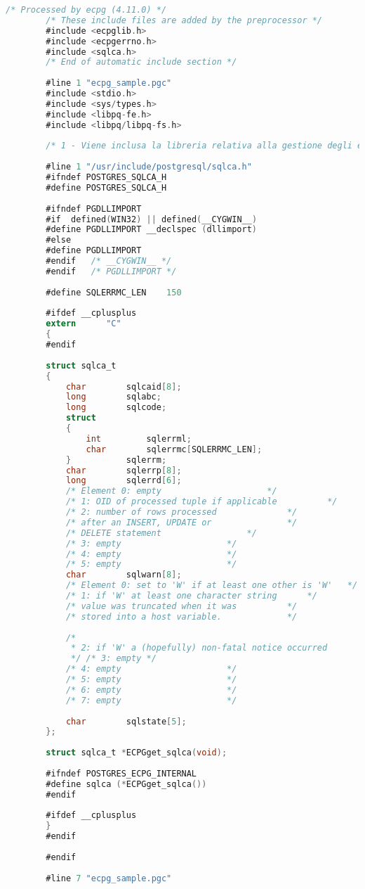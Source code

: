 \documentclass[12pt,a4paper,onecolumn]{article}
\begin{document}
	\begin{lstlisting}[language=C, caption=testECPG.c]
		/* Processed by ecpg (4.11.0) */
		/* These include files are added by the preprocessor */
		#include <ecpglib.h>
		#include <ecpgerrno.h>
		#include <sqlca.h>
		/* End of automatic include section */
		
		#line 1 "ecpg_sample.pgc"
		#include <stdio.h>
		#include <sys/types.h>
		#include <libpq-fe.h>
		#include <libpq/libpq-fs.h>
		
		/* 1 - Viene inclusa la libreria relativa alla gestione degli errori tramite la variabile globale sqlca (SQL communication area) */
		
		#line 1 "/usr/include/postgresql/sqlca.h"
		#ifndef POSTGRES_SQLCA_H
		#define POSTGRES_SQLCA_H
		
		#ifndef PGDLLIMPORT
		#if  defined(WIN32) || defined(__CYGWIN__)
		#define PGDLLIMPORT __declspec (dllimport)
		#else
		#define PGDLLIMPORT
		#endif   /* __CYGWIN__ */
		#endif   /* PGDLLIMPORT */
		
		#define SQLERRMC_LEN	150
		
		#ifdef __cplusplus
		extern		"C"
		{
		#endif
		
		struct sqlca_t
		{
			char		sqlcaid[8];
			long		sqlabc;
			long		sqlcode;
			struct
			{
				int			sqlerrml;
				char		sqlerrmc[SQLERRMC_LEN];
			}			sqlerrm;
			char		sqlerrp[8];
			long		sqlerrd[6];
			/* Element 0: empty						*/
			/* 1: OID of processed tuple if applicable			*/
			/* 2: number of rows processed				*/
			/* after an INSERT, UPDATE or				*/
			/* DELETE statement					*/
			/* 3: empty						*/
			/* 4: empty						*/
			/* 5: empty						*/
			char		sqlwarn[8];
			/* Element 0: set to 'W' if at least one other is 'W'	*/
			/* 1: if 'W' at least one character string		*/
			/* value was truncated when it was			*/
			/* stored into a host variable.             */
		
			/*
			 * 2: if 'W' a (hopefully) non-fatal notice occurred
			 */	/* 3: empty */
			/* 4: empty						*/
			/* 5: empty						*/
			/* 6: empty						*/
			/* 7: empty						*/
		
			char		sqlstate[5];
		};
		
		struct sqlca_t *ECPGget_sqlca(void);
		
		#ifndef POSTGRES_ECPG_INTERNAL
		#define sqlca (*ECPGget_sqlca())
		#endif
		
		#ifdef __cplusplus
		}
		#endif
		
		#endif
		
		#line 7 "ecpg_sample.pgc"
		

\end{lstlisting}
\end{document}
